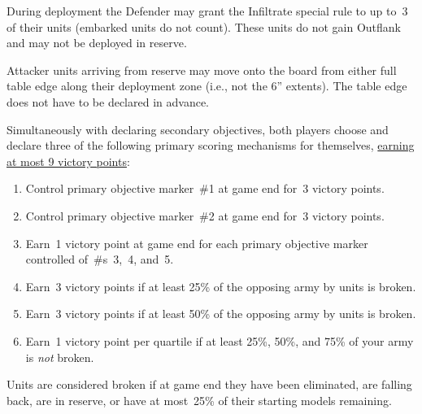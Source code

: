 \vspace{-2.5em}

 During deployment the Defender
may grant the Infiltrate special rule to up to~3 of their units
(embarked units do not count).  These units do not gain Outflank and
may not be deployed in reserve.

 Attacker units arriving from reserve
may move onto the board from either full table edge along their
deployment zone (i.e., not the 6'' extents).  The table edge does not
have to be declared in advance.




\begin{scoring}
  
\begin{primaries}

  Simultaneously with declaring secondary objectives, both players
  choose and declare three of the following primary scoring mechanisms
  for themselves, \underline{earning at most 9 victory points}:

  \begin{enumerate}[label=\Alph*.]\shortlist
  \item Control primary objective marker~\#1 at game end for~3 victory
    points.
  \item Control primary objective marker~\#2 at game end for~3 victory
    points.
  \item Earn~1 victory point at game end for each primary objective
    marker controlled of~\#s~3,~4, and~5.

  \item Earn~3 victory points if at least 25\% of the opposing army by
    units is broken.

  \item Earn~3 victory points if at least 50\% of the opposing army by
    units is broken.

  \item Earn~1 victory point per quartile if at least 25\%, 50\%, and
    75\% of your army is \emph{not} broken.
  \end{enumerate}

  Units are considered broken if at game end they have been
  eliminated, are falling back, are in reserve, or have at most~25\%
  of their starting models remaining.

\end{primaries}

\end{scoring}
